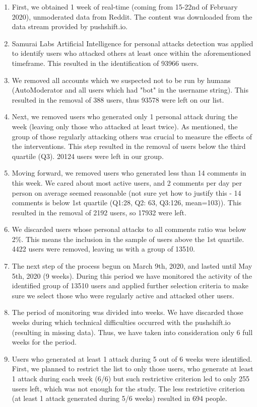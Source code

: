 \documentclass[
  10pt,
  dvipsnames,enabledeprecatedfontcommands]{scrartcl}
\begin{document}
\renewcommand{\labelenumii}{\Roman{enumii}}
 \begin{enumerate}
   \item First, we obtained 1 week of real-time (coming from 15-22nd of February 2020), unmoderated data from Reddit. The content was downloaded from the data stream provided by pushshift.io. 
   \item Samurai Labs Artificial Intelligence for personal attacks detection was applied to identify users who attacked others at least once within the aforementioned timeframe. This resulted in the identification of 93966 users. 
   \item We removed all accounts which we suspected not to be run by humans (AutoModerator and all users which had "bot" in the username string). This resulted in the removal of 388 users, thus 93578 were left on our list.
   \item Next, we removed users who generated only 1 personal attack during the week (leaving only those who attacked at least twice). As mentioned, the group of those regularly attacking others was crucial to measure the effects of the interventions. This step resulted in the removal of users below the third quartile (Q3). 20124 users were left in our group.
   \item Moving forward, we removed users who generated less than 14 comments in this week. We cared about most active users, and 2 comments per day per person on average seemed reasonable (not sure yet how to justify this - 14 comments is below 1st quartile (Q1:28, Q2: 63, Q3:126, mean=103)). This resulted in the removal of 2192 users, so 17932 were left.
   \item We discarded users whose personal attacks to all comments ratio was below 2\%. This means the inclusion in the sample of users above the 1st quartile. 4422 users were removed, leaving us with a group of 13510. 
   \item The next step of the process begun on March 9th, 2020, and lasted until May 5th, 2020 (9 weeks). During this period we have monitored the activity of the identified group of 13510 users and applied further selection criteria to make sure we select those who were regularly active and attacked other users. 
   \item The period of monitoring was divided into weeks. We have discarded those weeks during which technical difficulties occurred with the pushshift.io (resulting in missing data). Thus, we have taken into consideration only 6 full weeks for the period.
   \item Users who generated at least 1 attack during 5 out of 6 weeks were identified. First, we planned to restrict the list to only those users, who generate at least 1 attack during each week (6/6) but such restrictive criterion led to only 255 users left, which was not enough for the study. The less restrictive criterion (at least 1 attack generated during 5/6 weeks) resulted in 694 people. 

\end{enumerate}
\end{document}
